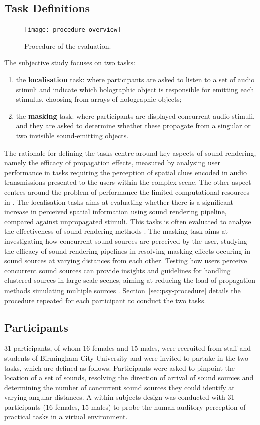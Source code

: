 \subsection{Task Definitions}
\begin{figure}[htbp]
    \centering
    \texttt{[image: procedure-overview]}
    \caption{Procedure of the evaluation. }
    \label{fig:psycho-procedure-overview}
\end{figure}
The subjective study focuses on two tasks:
\begin{enumerate}
    \item the \textbf{localisation} task: where participants are asked to listen to a set of audio stimuli and indicate which holographic object is responsible for emitting each stimulus, choosing from arrays of holographic objects;
    \item the \textbf{masking} task: where participants are displayed concurrent audio stimuli, and they are asked to determine whether these propagate from a singular or two invisible sound-emitting objects.
\end{enumerate}
The rationale for defining the tasks centre around key aspects of sound rendering, namely the efficacy of propagation effects, measured by analysing user performance in tasks requiring the perception of spatial clues encoded in audio transmissions presented to the users within the complex scene. The other aspect centres around the problem of performance the limited computational resources in .
The localisation tasks aims at evaluating whether there is a significant increase in perceived spatial information using sound rendering pipeline, compared against unpropagated stimuli. This tasks is often evaluated to analyse the effectiveness of sound rendering methods \citep{rungta2016psychoacoustic}.
The masking task aims at investigating how concurrent sound sources are perceived by the user, studying the efficacy of sound rendering pipelines in resolving masking effects occuring in sound sources at varying distances from each other. Testing how users perceive concurrent sound sources can provide insights and guidelines for handling clustered sources in large-scale scenes, aiming at reducing the load of propagation methods simulating multiple sources \citep{schissler2016interactive}.
Section~\ref{sec:psy-procedure} details the procedure repeated for each participant to conduct the two tasks.

\subsection{Participants}
31 participants, of whom 16 females and 15 males, were recruited from staff and students of Birmingham City University and were invited to partake in the two tasks, which are defined as follows. Participants were asked to pinpoint the location of a set of sounds, resolving the direction of arrival of sound sources and determining the number of concurrent sound sources they could identify at varying angular distances. A within-subjects design was conducted with 31 participants (16 females, 15 males) to probe the human auditory perception of practical tasks in a virtual environment.

